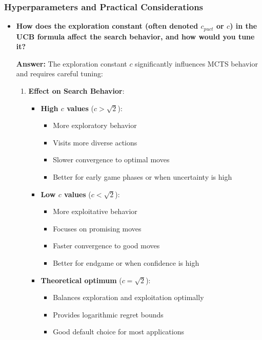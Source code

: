 \subsubsection{Hyperparameters and Practical Considerations}
\begin{itemize}
    \item \textbf{How does the exploration constant (often denoted $c_{puct}$ or $c$) in the UCB formula affect the search behavior, and how would you tune it?}
    
    \textbf{Answer:} The exploration constant $c$ significantly influences MCTS behavior and requires careful tuning:
    
    \begin{enumerate}
        \item \textbf{Effect on Search Behavior}:
        \begin{itemize}
            \item \textbf{High $c$ values} ($c > \sqrt{2}$):
            \begin{itemize}
                \item More exploratory behavior
                \item Visits more diverse actions
                \item Slower convergence to optimal moves
                \item Better for early game phases or when uncertainty is high
            \end{itemize}
            
            \item \textbf{Low $c$ values} ($c < \sqrt{2}$):
            \begin{itemize}
                \item More exploitative behavior
                \item Focuses on promising moves
                \item Faster convergence to good moves
                \item Better for endgame or when confidence is high
            \end{itemize}
            
            \item \textbf{Theoretical optimum} ($c = \sqrt{2}$):
            \begin{itemize}
                \item Balances exploration and exploitation optimally
                \item Provides logarithmic regret bounds
                \item Good default choice for most applications
            \end{itemize}
        \end{itemize}
        

\end{enumerate}
\end{itemize}
